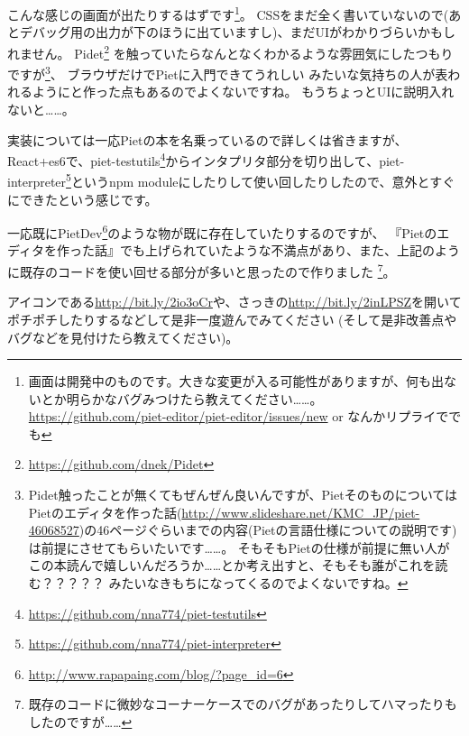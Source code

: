 こんな感じの画面が出たりするはずです\footnote{画面は開発中のものです。大きな変更が入る可能性がありますが、何も出ないとか明らかなバグみつけたら教えてください……。
\url{https://github.com/piet-editor/piet-editor/issues/new} or なんかリプライででも}。
CSSをまだ全く書いていないので(あとデバッグ用の出力が下のほうに出ていますし)、まだUIがわかりづらいかもしれません。
Pidet\footnote{\url{https://github.com/dnek/Pidet}}
を触っていたらなんとなくわかるような雰囲気にしたつもりですが\footnote{Pidet触ったことが無くてもぜんぜん良いんですが、PietそのものについてはPietのエディタを作った話(\url{http://www.slideshare.net/KMC_JP/piet-46068527})の46ページぐらいまでの内容(Pietの言語仕様についての説明です)は前提にさせてもらいたいです……。
そもそもPietの仕様が前提に無い人がこの本読んで嬉しいんだろうか……とか考え出すと、そもそも誰がこれを読む？？？？？ みたいなきもちになってくるのでよくないですね。}、
ブラウザだけでPietに入門できてうれしい みたいな気持ちの人が表われるようにと作った点もあるのでよくないですね。
もうちょっとUIに説明入れないと……。

実装については一応Pietの本を名乗っているので詳しくは省きますが、React+es6で、piet-testutils\footnote{\url{https://github.com/nna774/piet-testutils}}からインタプリタ部分を切り出して、piet-interpreter\footnote{\url{https://github.com/nna774/piet-interpreter}}というnpm moduleにしたりして使い回したりしたので、意外とすぐにできたという感じです。

一応既にPietDev\footnote{\url{http://www.rapapaing.com/blog/?page_id=6}}のような物が既に存在していたりするのですが、
『Pietのエディタを作った話』でも上げられていたような不満点があり、また、上記のように既存のコードを使い回せる部分が多いと思ったので作りました
\footnote{既存のコードに微妙なコーナーケースでのバグがあったりしてハマったりもしたのですが……}。

アイコンである\url{http://bit.ly/2io3oCr}や、さっきの\url{http://bit.ly/2inLPSZ}を開いてポチポチしたりするなどして是非一度遊んでみてください
(そして是非改善点やバグなどを見付けたら教えてください)。
